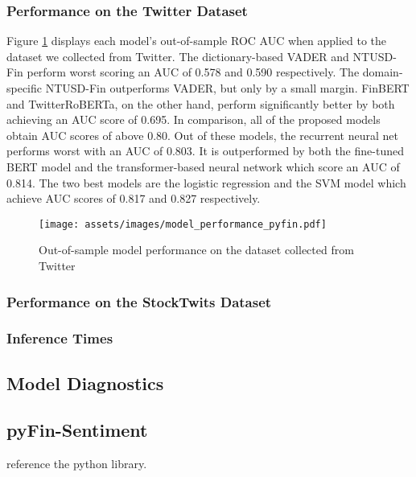 \subsubsection{Performance on the Twitter Dataset}
Figure \ref{figure-model-performance-twitter} displays each model's out-of-sample ROC AUC when applied to the dataset we collected from Twitter. The dictionary-based VADER and NTUSD-Fin perform worst scoring an AUC of 0.578 and 0.590 respectively. The domain-specific NTUSD-Fin outperforms VADER, but only by a small margin. FinBERT and TwitterRoBERTa, on the other hand, perform significantly better by both achieving an AUC score of 0.695.\newline
In comparison, all of the proposed models obtain AUC scores of above 0.80. Out of these models, the recurrent neural net performs worst with an AUC of 0.803. It is outperformed by both the fine-tuned BERT model and the transformer-based neural network which score an AUC of 0.814. The two best models are the logistic regression and the SVM model which achieve AUC scores of 0.817 and 0.827 respectively.


\begin{figure}[!ht]
	\texttt{[image: assets/images/model\_performance\_pyfin.pdf]}	
	\caption{Out-of-sample model performance on the dataset collected from Twitter}
	\label{figure-model-performance-twitter}
\end{figure}



\subsubsection{Performance on the StockTwits Dataset}
\subsubsection{Inference Times}


\subsection{Model Diagnostics}

\subsection{pyFin-Sentiment}
reference the python library.